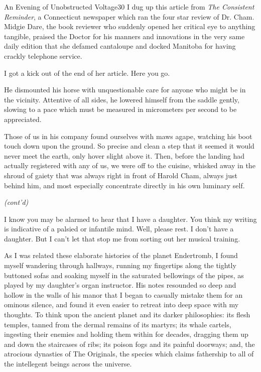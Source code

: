 \documentclass[12pt,twoside]{report}
\begin{document}
	\begin{sidebar}{An Evening of Unobstructed Voltage}{30}
		I dug up this article from \textit{The Consistent Reminder}, a Connecticut newspaper which ran the four star review of Dr. Cham. Midgie Dare, the book reviewer who suddenly opened her critical eye to anything tangible, praised the Doctor for his manners and innovations in the very same daily edition that she defamed cantaloupe and docked Manitoba for having crackly telephone service.\vspace{6px}
		
		I got a kick out of the end of her article. Here you go.\vspace{6px}
		
		\begin{quoting}[rightmargin=0pt,leftmargin=0.5\leftmargin,font=itshape]
			He dismounted his horse with unquestionable care for anyone who might be in the vicinity. Attentive of all sides, he lowered himself from the saddle gently, slowing to a pace which must be measured in micrometers per second to be appreciated.\vspace{6px}
			
			Those of us in his company found ourselves with maws agape, watching his boot touch down upon the ground. So precise and clean a step that it seemed it would never meet the earth, only hover slight above it. Then, before the landing had actually registered with any of us, we were off to the cuisine, whisked away in the shroud of gaiety that was always right in front of Harold Cham, always just behind him, and most especially concentrate directly in his own luminary self.
		\end{quoting}
		
		\hfill\textit{(cont'd)}
	\end{sidebar}

I know you may be alarmed to hear that I have a daughter.  You think
my writing is indicative of a palsied or infantile mind.  Well, please
rest.  I don't have a daughter. But I can't let that stop me from
sorting out her musical training.

As I was related these elaborate histories of the planet Endertromb, I
found myself wandering through hallways, running my fingertips along
the tightly buttoned sofas and soaking myself in the saturated
bellowings of the pipes, as played by my daughter's organ instructor.
His notes resounded so deep and hollow in the walls of his manor that
I began to casually mistake them for an ominous silence, and found it
even easier to retreat into deep space with my thoughts.  To think
upon the ancient planet and its darker philosophies: its flesh
temples, tanned from the dermal remains of its martyrs; its whale
cartels, ingesting their enemies and holding them within for decades,
dragging them up and down the staircases of ribs; its poison fogs and
its painful doorways; and, the atrocious dynasties of The Originals,
the species which claims fathership to all of the intellegent beings
across the universe.
\end{document}
